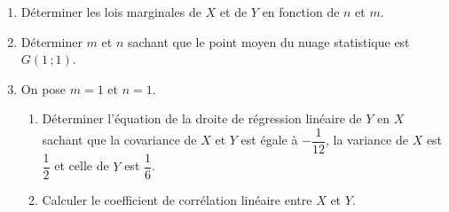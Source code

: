 \documentclass[11pt]{article}
\begin{document}
\begin{enumerate}
  \item Déterminer les lois marginales de $X$ et de $Y$ en fonction de $n$ et $m$.
  \item Déterminer $m$ et $n$ sachant que le point moyen du nuage statistique est $G(1\,;1)$.
  \item On pose $m = 1$ et $n = 1$.
  \begin{enumerate}[label=\alph*.]
    \item Déterminer l'équation de la droite de régression linéaire de $Y$ en $X$ sachant que la covariance de $X$ et $Y$ est égale à $-\dfrac{1}{12}$, la variance de $X$ est $\dfrac{1}{2}$ et celle de $Y$ est $\dfrac{1}{6}$.
    \item Calculer le coefficient de corrélation linéaire entre $X$ et $Y$.
  \end{enumerate}
\end{enumerate}
\end{document}
